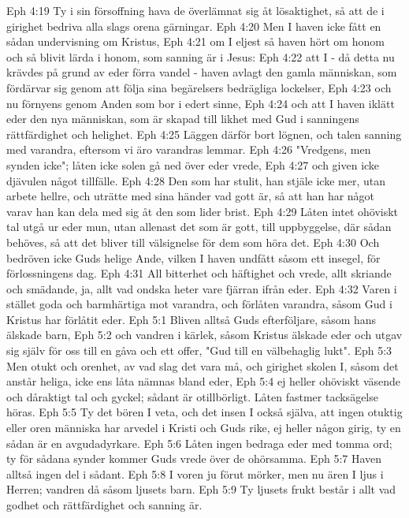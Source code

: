 Eph 4:19  Ty i sin försoffning hava de överlämnat sig åt lösaktighet, så att de i girighet bedriva alla slags orena gärningar.
Eph 4:20  Men I haven icke fått en sådan undervisning om Kristus,
Eph 4:21  om I eljest så haven hört om honom och så blivit lärda i honom, som sanning är i Jesus:
Eph 4:22  att I - då detta nu krävdes på grund av eder förra vandel - haven avlagt den gamla människan, som fördärvar sig genom att följa sina begärelsers bedrägliga lockelser,
Eph 4:23  och nu förnyens genom Anden som bor i edert sinne,
Eph 4:24  och att I haven iklätt eder den nya människan, som är skapad till likhet med Gud i sanningens rättfärdighet och helighet.
Eph 4:25  Läggen därför bort lögnen, och talen sanning med varandra, eftersom vi äro varandras lemmar.
Eph 4:26  "Vredgens, men synden icke"; låten icke solen gå ned över eder vrede,
Eph 4:27  och given icke djävulen något tillfälle.
Eph 4:28  Den som har stulit, han stjäle icke mer, utan arbete hellre, och uträtte med sina händer vad gott är, så att han har något varav han kan dela med sig åt den som lider brist.
Eph 4:29  Låten intet ohöviskt tal utgå ur eder mun, utan allenast det som är gott, till uppbyggelse, där sådan behöves, så att det bliver till välsignelse för dem som höra det.
Eph 4:30  Och bedröven icke Guds helige Ande, vilken I haven undfått såsom ett insegel, för förlossningens dag.
Eph 4:31  All bitterhet och häftighet och vrede, allt skriande och smädande, ja, allt vad ondska heter vare fjärran ifrån eder.
Eph 4:32  Varen i stället goda och barmhärtiga mot varandra, och förlåten varandra, såsom Gud i Kristus har förlåtit eder.
Eph 5:1  Bliven alltså Guds efterföljare, såsom hans älskade barn,
Eph 5:2  och vandren i kärlek, såsom Kristus älskade eder och utgav sig själv för oss till en gåva och ett offer, "Gud till en välbehaglig lukt".
Eph 5:3  Men otukt och orenhet, av vad slag det vara må, och girighet skolen I, såsom det anstår heliga, icke ens låta nämnas bland eder,
Eph 5:4  ej heller ohöviskt väsende och dåraktigt tal och gyckel; sådant är otillbörligt. Låten fastmer tacksägelse höras.
Eph 5:5  Ty det bören I veta, och det insen I också själva, att ingen otuktig eller oren människa har arvedel i Kristi och Guds rike, ej heller någon girig, ty en sådan är en avgudadyrkare.
Eph 5:6  Låten ingen bedraga eder med tomma ord; ty för sådana synder kommer Guds vrede över de ohörsamma.
Eph 5:7  Haven alltså ingen del i sådant.
Eph 5:8  I voren ju förut mörker, men nu ären I ljus i Herren; vandren då såsom ljusets barn.
Eph 5:9  Ty ljusets frukt består i allt vad godhet och rättfärdighet och sanning är.
